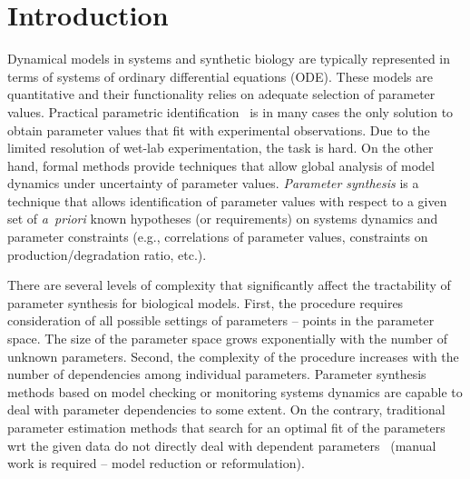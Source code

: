 \documentclass{llncs}
\begin{document}
\begin{abstract}

\end{abstract}

\enlargethispage{6mm}
\section{Introduction}
\label{sec:intro}


Dynamical models in systems and synthetic biology are typically represented in terms of systems of ordinary differential equations (ODE). These models are quantitative and their functionality relies on adequate selection of parameter values. Practical parametric identification~\cite{Raue} is in many cases the only solution to obtain parameter values that fit with experimental observations.  Due to the limited resolution of wet-lab experimentation, the task is hard. On the other hand, formal methods provide techniques that allow global analysis of model dynamics under uncertainty of parameter values. \emph{Parameter synthesis} is a technique that allows identification of parameter values with respect to a given set of \emph{a~priori} known hypotheses (or requirements) on systems dynamics and parameter constraints (e.g., correlations of parameter values, constraints on production/degradation ratio, etc.).         

There are several levels of complexity that
significantly affect the tractability of parameter synthesis for biological
models. First, the procedure requires consideration of all possible settings of
parameters -- points in the parameter space. The size of the parameter space grows
exponentially with the number of unknown parameters. 
 Second, the complexity of the procedure increases with the number of dependencies among individual parameters. Parameter synthesis methods based on model checking or monitoring systems dynamics are capable to deal with parameter dependencies to some extent. On the contrary, traditional parameter estimation methods that search for an optimal fit of the parameters wrt the given data do not directly deal with dependent parameters~\cite{Raue} (manual work is required -- model reduction or reformulation). 
\end{document}
